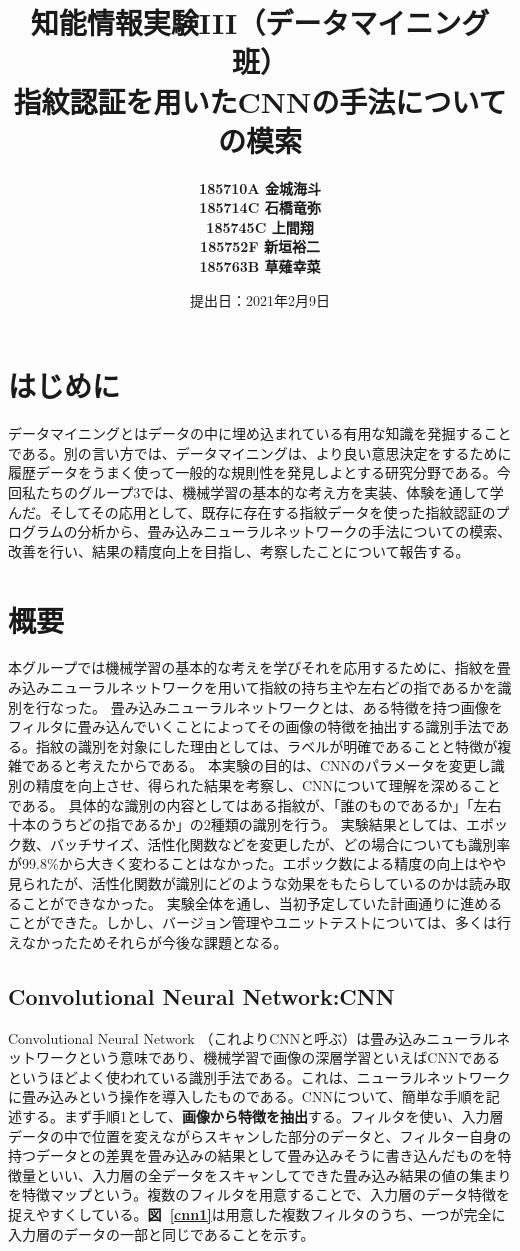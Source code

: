 \documentclass[a4paper, 11pt, titlepage]{jsarticle}
\title{知能情報実験III（データマイニング班）\\指紋認証を用いたCNNの手法についての模索}
\author{\textbf{185710A 金城海斗}\\
\textbf{185714C 石橋竜弥}\\
 \textbf{185745C 上間翔}\\
 \textbf{185752F 新垣裕二}\\
 \textbf{185763B 草薙幸菜}}
\date{提出日：2021年2月9日}
\begin{document}
\maketitle
\tableofcontents
\clearpage


\section{はじめに}
データマイニングとはデータの中に埋め込まれている有用な知識を発掘することである。別の言い方では、データマイニングは、より良い意思決定をするために履歴データをうまく使って一般的な規則性を発見しよとする研究分野である。今回私たちのグループ3では、機械学習の基本的な考え方を実装、体験を通して学んだ。そしてその応用として、既存に存在する指紋データを使った指紋認証のプログラムの分析から、畳み込みニューラルネットワークの手法についての模索、改善を行い、結果の精度向上を目指し、考察したことについて報告する。
\section{概要}
本グループでは機械学習の基本的な考えを学びそれを応用するために、指紋を畳み込みニューラルネットワークを用いて指紋の持ち主や左右どの指であるかを識別を行なった。
畳み込みニューラルネットワークとは、ある特徴を持つ画像をフィルタに畳み込んでいくことによってその画像の特徴を抽出する識別手法である。指紋の識別を対象にした理由としては、ラベルが明確であることと特徴が複雑であると考えたからである。
本実験の目的は、CNNのパラメータを変更し識別の精度を向上させ、得られた結果を考察し、CNNについて理解を深めることである。
具体的な識別の内容としてはある指紋が、「誰のものであるか」「左右十本のうちどの指であるか」の2種類の識別を行う。
実験結果としては、エポック数、バッチサイズ、活性化関数などを変更したが、どの場合についても識別率が99.8\%から大きく変わることはなかった。エポック数による精度の向上はやや見られたが、活性化関数が識別にどのような効果をもたらしているのかは読み取ることができなかった。
実験全体を通し、当初予定していた計画通りに進めることができた。しかし、バージョン管理やユニットテストについては、多くは行えなかったためそれらが今後な課題となる。
\subsection{Convolutional Neural Network:CNN}
Convolutional Neural Network （これよりCNNと呼ぶ）は畳み込みニューラルネットワークという意味であり、機械学習で画像の深層学習といえばCNNであるというほどよく使われている識別手法である。これは、ニューラルネットワークに畳み込みという操作を導入したものである。CNNについて、簡単な手順を記述する。まず手順1として、\textbf{画像から特徴を抽出}する。フィルタを使い、入力層データの中で位置を変えながらスキャンした部分のデータと、フィルター自身の持つデータとの差異を畳み込みの結果として畳み込みそうに書き込んだものを特徴量といい、入力層の全データをスキャンしてできた畳み込み結果の値の集まりを特徴マップという。複数のフィルタを用意することで、入力層のデータ特徴を捉えやすくしている。\textbf{図~\ref{cnn1}}は用意した複数フィルタのうち、一つが完全に入力層のデータの一部と同じであることを示す。
\end{document}

